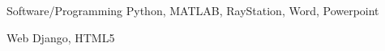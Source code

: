 

\begin{cvskills}

  \cvskill
    {Software/Programming} %
    {Python, MATLAB, RayStation, Word, Powerpoint} %

  \cvskill
    {Web} %
    {Django, HTML5} %


\end{cvskills}
